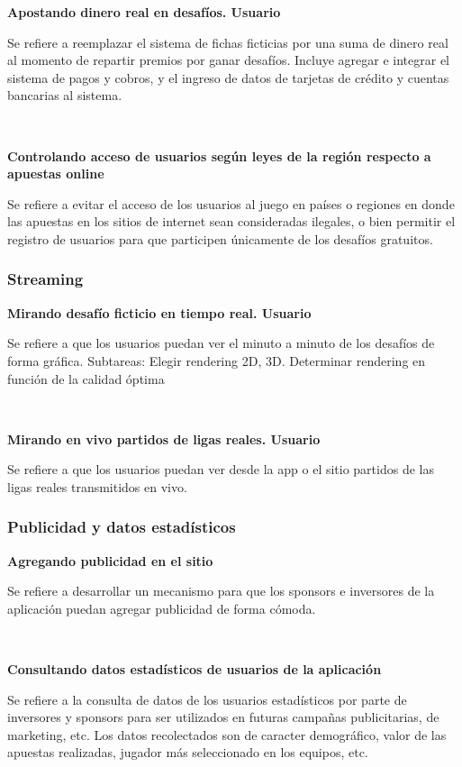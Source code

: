 \textbf{Apostando dinero real en desafíos. Usuario}

Se refiere a reemplazar el sistema de fichas ficticias por una suma de dinero real al momento de repartir premios por ganar desafíos.
Incluye agregar e integrar el sistema de pagos y cobros, y el ingreso de datos de tarjetas de crédito y cuentas bancarias al sistema.

~

\textbf{Controlando acceso de usuarios según leyes de la región respecto a apuestas online}

Se refiere a evitar el acceso de los usuarios al juego en países o regiones en donde las apuestas en los sitios de internet sean consideradas
ilegales, o bien permitir el registro de usuarios para que participen únicamente de los desafíos gratuitos.



\subsubsection{Streaming}

\textbf{Mirando desafío ficticio en tiempo real. Usuario}

Se refiere a que los usuarios puedan ver el minuto a minuto de los desafíos de forma gráfica. 
Subtareas: Elegir rendering 2D, 3D. Determinar rendering en función de la calidad óptima

~

\textbf{Mirando en vivo partidos de ligas reales. Usuario}

Se refiere a que los usuarios puedan ver desde la app o el sitio partidos de las ligas reales transmitidos en vivo.

\subsubsection{Publicidad y datos estadísticos}

\textbf{Agregando publicidad en el sitio}

Se refiere a desarrollar un mecanismo para que los sponsors e inversores de la aplicación puedan agregar publicidad de forma cómoda.

~

\textbf{Consultando datos estadísticos de usuarios de la aplicación}

Se refiere a la consulta de datos de los usuarios estadísticos por parte de inversores y sponsors para ser utilizados en futuras campañas publicitarias,
de marketing, etc. Los datos recolectados son de caracter demográfico, valor de las apuestas realizadas, jugador más seleccionado en los equipos, etc.

